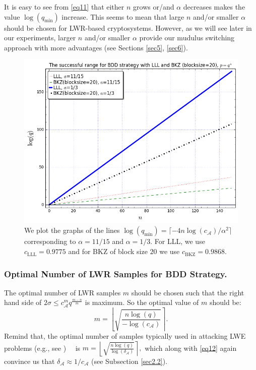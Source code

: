 \documentclass[runningheads]{llncs}
\begin{document}
\begin{remark} 
	It is easy to see from \eqref{eq11} that either $n$ grows or/and $\alpha$ decreases makes the value $\log (q_{\text{min}})$ increase. This seems to mean that large $n$ and/or smaller $\alpha$ should be chosen for LWR-based cryptosystems. However, as we will see later in our experiments, larger $n$ and/or smaller $\alpha$ provide our mudulus switching approach with more advantages (see Sections \ref{sec5}, \ref{sec6}). 
	
\end{remark} 

\begin{figure}[t]
	\centering
	\includegraphics[scale=0.5, bb=0 0 560 430]{picture.png}
	\caption{We plot the graphs of the lines $\log (q_{\text{min}})=\lceil-4n  \log (c_{\mathcal{A}})/\alpha^2 \rceil$ corresponding to $\alpha=11/15$ and $\alpha=1/3$. For LLL, we use $c_{\text{LLL}}=0.9775$ and for BKZ of block size $20$ we use $c_{\text{BKZ}}=0.9868$.}
	\label{fig:success_range}
\end{figure}
\subsubsection{Optimal Number of LWR Samples for BDD  Strategy.}
The optimal number of LWR samples $m$ should be chosen such that the right hand side of
$2\sigma \leq c_{\mathcal{A}} ^{m} q^{\frac{m-n}{m}}$ is maximum.
So the optimal value of $m$ should be:
\begin{equation}\label{eq12} 
m=\left \lfloor \sqrt{\frac{n\log (q)}{- \log (c_{\mathcal{A}})}} \right\rceil.
\end{equation}
Remind that, the optimal number of samples typically  used in attacking LWE problems (e.g., see  \cite{LP11, MR09})　 is
$m=\left \lfloor \sqrt{\frac{n\log (q)}{ \log (\delta_{\mathcal{A}})}} \right\rceil,$
which along with \eqref{eq12} again convince us that $\delta_{\mathcal{A}} \approx 1/c_{\mathcal{A}}$ (see Subsection \ref{sec2.2}).
\end{document}
